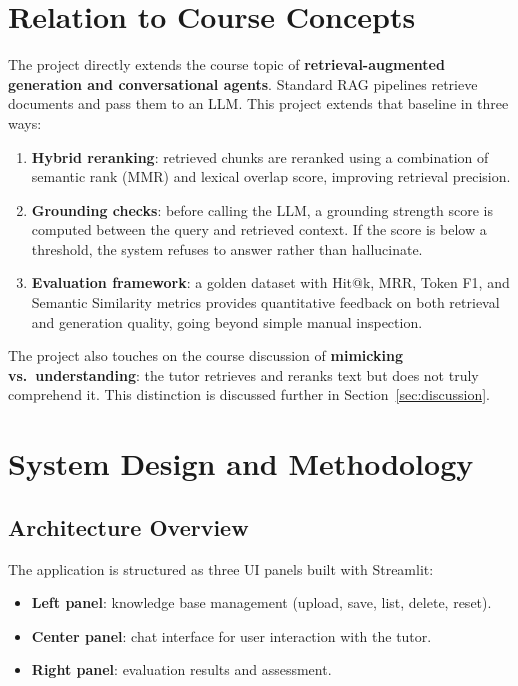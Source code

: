 \documentclass[12pt,a4paper]{article}
\begin{document}
\section{Relation to Course Concepts}

The project directly extends the course topic of \textbf{retrieval-augmented generation
and conversational agents}. Standard RAG pipelines retrieve documents and pass them
to an LLM. This project extends that baseline in three ways:

\begin{enumerate}[leftmargin=*]
  \item \textbf{Hybrid reranking}: retrieved chunks are reranked using a combination
        of semantic rank (MMR) and lexical overlap score, improving retrieval precision.
  \item \textbf{Grounding checks}: before calling the LLM, a grounding strength score
        is computed between the query and retrieved context. If the score is below a
        threshold, the system refuses to answer rather than hallucinate.
  \item \textbf{Evaluation framework}: a golden dataset with Hit@k, MRR, Token F1,
        and Semantic Similarity metrics provides quantitative feedback on both
        retrieval and generation quality, going beyond simple manual inspection.
\end{enumerate}

The project also touches on the course discussion of \textbf{mimicking vs.\
understanding}: the tutor retrieves and reranks text but does not truly comprehend
it. This distinction is discussed further in Section~\ref{sec:discussion}.

\section{System Design and Methodology}

\subsection{Architecture Overview}

The application is structured as three UI panels built with Streamlit:

\begin{itemize}[leftmargin=*]
  \item \textbf{Left panel}: knowledge base management (upload, save, list, delete, reset).
  \item \textbf{Center panel}: chat interface for user interaction with the tutor.
  \item \textbf{Right panel}: evaluation results and assessment.
\end{itemize}
\end{document}
